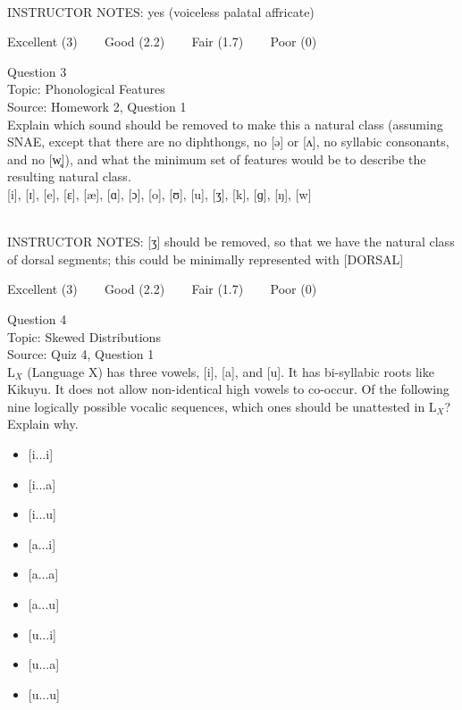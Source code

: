 \documentclass[12pt]{article}
\begin{document}
~\\
INSTRUCTOR NOTES: yes (voiceless palatal affricate)


\vfill
Excellent (3) ~~~ Good (2.2) ~~~ Fair (1.7) ~~~ Poor (0)
\newpage

{\large Question 3}\\

Topic: Phonological Features\\
Source: Homework 2, Question 1\\

Explain which sound should be removed to make this a natural class (assuming SNAE, except that there are no diphthongs, no [ə] or [ʌ], no syllabic consonants, and no [w̥]), and what the minimum set of features would be to describe the resulting natural class.\\

{[i]}, {[ɪ]}, {[e]}, {[ɛ]}, {[æ]}, {[ɑ]}, {[ɔ]}, {[o]}, {[ʊ]}, {[u]}, {[ʒ]}, {[k]}, {[ɡ]}, {[ŋ]}, {[w]}


~\\
INSTRUCTOR NOTES: [ʒ] should be removed, so that we have the natural class of dorsal segments; this could be minimally represented with [DORSAL]


\vfill
Excellent (3) ~~~ Good (2.2) ~~~ Fair (1.7) ~~~ Poor (0)
\newpage

{\large Question 4}\\

Topic: Skewed Distributions\\
Source: Quiz 4, Question 1\\

L$_X$ (Language X) has three vowels, [i], [a], and [u]. It has bi-syllabic roots like Kikuyu. It does not allow non-identical high vowels to co-occur. Of the following nine logically possible vocalic sequences, which ones should be unattested in L$_X$? Explain why.\\

\begin{itemize} \item {[i...i]} \item {[i...a]} \item {[i...u]} \item {[a...i]} \item {[a...a]} \item {[a...u]} \item {[u...i]} \item {[u...a]} \item {[u...u]} \end{itemize}
\end{document}
